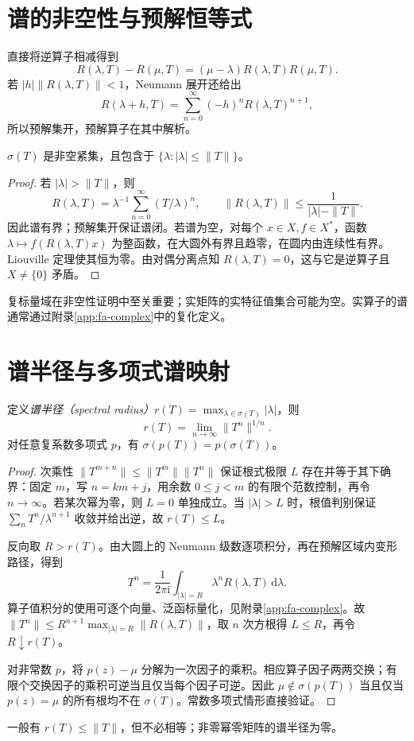 \section{谱的非空性与预解恒等式}
直接将逆算子相减得到
\[
 R(\lambda,T)-R(\mu,T)=(\mu-\lambda)R(\lambda,T)R(\mu,T).
\]
若 $|h|\|R(\lambda,T)\|<1$，Neumann 展开还给出
\[
 R(\lambda+h,T)=\sum_{n=0}^{\infty}(-h)^nR(\lambda,T)^{n+1},
\]
所以预解集开，预解算子在其中解析。

\begin{theorem}\label{thm:fa-spectrum-compact}
$\sigma(T)$ 是非空紧集，且包含于 $\{\lambda:|\lambda|\leq\|T\|\}$。
\end{theorem}
\begin{proof}
若 $|\lambda|>\|T\|$，则
\[
 R(\lambda,T)=\lambda^{-1}\sum_{n=0}^{\infty}(T/\lambda)^n,
 \qquad\|R(\lambda,T)\|\leq\frac1{|\lambda|-\|T\|}.
\]
因此谱有界；预解集开保证谱闭。若谱为空，对每个 $x\in X,f\in X^*$，函数 $\lambda\mapsto f(R(\lambda,T)x)$ 为整函数，在大圆外有界且趋零，在圆内由连续性有界。Liouville 定理使其恒为零。由对偶分离点知 $R(\lambda,T)=0$，这与它是逆算子且 $X\ne\{0\}$ 矛盾。
\end{proof}
复标量域在非空性证明中至关重要；实矩阵的实特征值集合可能为空。实算子的谱通常通过附录\ref{app:fa-complex}中的复化定义。

\section{谱半径与多项式谱映射}
\begin{theorem}\label{thm:fa-spectral-radius}
定义\emph{谱半径（spectral radius）}$r(T)=\max_{\lambda\in\sigma(T)}|\lambda|$，则
\begin{equation}
 r(T)=\lim_{n\to\infty}\|T^n\|^{1/n}.
 \label{eq:fa-spectral-radius}
\end{equation}
对任意复系数多项式 $p$，有 $\sigma(p(T))=p(\sigma(T))$。
\end{theorem}
\begin{proof}
次乘性 $\|T^{m+n}\|\leq\|T^m\|\|T^n\|$ 保证根式极限 $L$ 存在并等于其下确界：固定 $m$，写 $n=km+j$，用余数 $0\leq j<m$ 的有限个范数控制，再令 $n\to\infty$。若某次幂为零，则 $L=0$ 单独成立。当 $|\lambda|>L$ 时，根值判别保证 $\sum_nT^n/\lambda^{n+1}$ 收敛并给出逆，故 $r(T)\leq L$。

反向取 $R>r(T)$。由大圆上的 Neumann 级数逐项积分，再在预解区域内变形路径，得到
\[
 T^n=\frac1{2\pi\mathrm i}\int_{|\lambda|=R}\lambda^nR(\lambda,T)\,\mathrm d\lambda.
\]
算子值积分的使用可逐个向量、泛函标量化，见附录\ref{app:fa-complex}。故 $\|T^n\|\leq R^{n+1}\max_{|\lambda|=R}\|R(\lambda,T)\|$，取 $n$ 次方根得 $L\leq R$，再令 $R\downarrow r(T)$。

对非常数 $p$，将 $p(z)-\mu$ 分解为一次因子的乘积。相应算子因子两两交换；有限个交换因子的乘积可逆当且仅当每个因子可逆。因此 $\mu\notin\sigma(p(T))$ 当且仅当 $p(z)=\mu$ 的所有根均不在 $\sigma(T)$。常数多项式情形直接验证。
\end{proof}
一般有 $r(T)\leq\|T\|$，但不必相等；非零幂零矩阵的谱半径为零。

